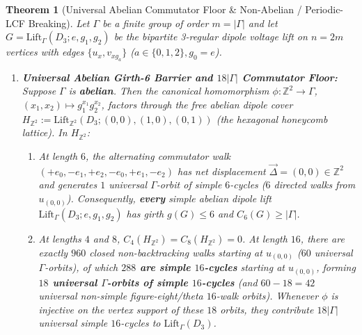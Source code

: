 \documentclass[10pt,a4paper]{article}
\newtheorem{theorem}{Theorem}[section]
\theoremstyle{definition}
\theoremstyle{remark}
\begin{document}
\begin{theorem}[Universal Abelian Commutator Floor \& Non-Abelian / Periodic-LCF Breaking]\label{thm:commutator}
Let $\Gamma$ be a finite group of order $m = |\Gamma|$ and let $G = \mathrm{Lift}_\Gamma(D_3; e, g_1, g_2)$ be the bipartite 3-regular dipole voltage lift on $n = 2m$ vertices with edges $\{u_x, v_{x g_a}\}$ ($a \in \{0, 1, 2\}, g_0 = e$).
\begin{enumerate}[label=(\alph*),nosep]
  \item \textbf{Universal Abelian Girth-6 Barrier and $18 |\Gamma|$ Commutator Floor:} Suppose $\Gamma$ is \textbf{abelian}. Then the canonical homomorphism $\phi: \mathbb{Z}^2 \to \Gamma$, $(x_1, x_2) \mapsto g_1^{x_1} g_2^{x_2}$, factors through the free abelian dipole cover $H_{\mathbb{Z}^2} := \mathrm{Lift}_{\mathbb{Z}^2}(D_3; (0,0), (1,0), (0,1))$ (the hexagonal honeycomb lattice). In $H_{\mathbb{Z}^2}$:
  \begin{enumerate}[label=(\roman*),nosep]
    \item At length $6$, the alternating commutator walk $(+e_0, -e_1, +e_2, -e_0, +e_1, -e_2)$ has net displacement $\vec{\Delta} = (0,0) \in \mathbb{Z}^2$ and generates $1$ universal $\Gamma$-orbit of simple $6$-cycles ($6$ directed walks from $u_{(0,0)}$). Consequently, \textbf{every} simple abelian dipole lift $\mathrm{Lift}_\Gamma(D_3; e, g_1, g_2)$ has girth $g(G) \le 6$ and $C_6(G) \ge |\Gamma|$.
    \item At lengths $4$ and $8$, $C_4(H_{\mathbb{Z}^2}) = C_8(H_{\mathbb{Z}^2}) = 0$. At length $16$, there are exactly $960$ closed non-backtracking walks starting at $u_{(0,0)}$ ($60$ universal $\Gamma$-orbits), of which \textbf{$288$ are simple $16$-cycles} starting at $u_{(0,0)}$, forming \textbf{$18$ universal $\Gamma$-orbits of simple $16$-cycles} (and $60 - 18 = 42$ universal non-simple figure-eight/theta $16$-walk orbits). Whenever $\phi$ is injective on the vertex support of these $18$ orbits, they contribute $18 |\Gamma|$ universal simple $16$-cycles to $\mathrm{Lift}_\Gamma(D_3)$.
  \end{enumerate}

\end{enumerate}
\end{theorem}
\end{document}
